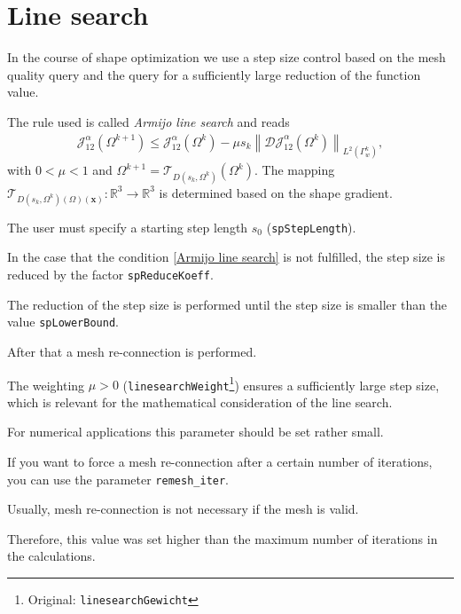 \documentclass[a4paper,oneside]{book}
\numberwithin{equation}{section}
\begin{document}
\section{Line search}
In the course of shape optimization we use a step size control based on the mesh quality query and the query for a sufficiently large reduction of the function value.

The rule used is called \textit{Armijo line search} and reads
\begin{align}
\label{Armijo line search}
\mathcal{J}_{12}^\alpha \left(\Omega^{k+1}\right) \le \mathcal{J}_{12}^\alpha \left(\Omega ^k\right) - \mu s_k \left\|\mathcal{DJ} _{12}^\alpha \left(\Omega ^k\right)\right\| _{L^2\left(\Gamma _w^k\right)},
\end{align}
with $0<\mu<1$ and $\Omega ^{k+1} = \mathcal{T}_{D\left(s_k, \Omega^k\right)} \left(\Omega ^k\right)$.
The mapping $\mathcal{T} _{D\left(s_k, \Omega ^k\right) \left(\Omega\right)\left(\boldsymbol{x}\right)} : \mathbb{R}^3 \to \mathbb{R}^3$ is determined based on the shape gradient.

The user must specify a starting step length $s_0$ (\texttt{spStepLength}).

In the case that
the condition \eqref{Armijo line search} is not fulfilled, the step size is reduced by the factor \texttt{spReduceKoeff}.

The reduction of the step size is performed until the step size is smaller than the value \texttt{spLowerBound}.

After that a mesh re-connection is performed.

The weighting $\mu > 0$ (\texttt{linesearchWeight}\footnote{Original: \texttt{linesearchGewicht}}) ensures a sufficiently large step size, which is relevant for the mathematical consideration of the line search.

For numerical applications this parameter should be set rather small.

If you want to force a mesh re-connection after a certain number of iterations, you can use the parameter \verb|remesh_iter|.

Usually, mesh re-connection is not necessary if the mesh is valid.

Therefore, this value was set higher than the maximum number of iterations in the calculations.
\end{document}
